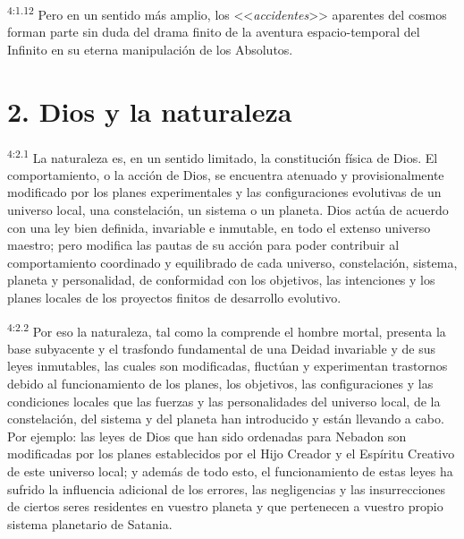 \par
\textsuperscript{4:1.12} Pero en un sentido más amplio, los <<\textit{accidentes}>> aparentes del cosmos forman parte sin duda del drama finito de la aventura espacio-temporal del Infinito en su eterna manipulación de los Absolutos.

\section*{2. Dios y la naturaleza}
\par
\textsuperscript{4:2.1} La naturaleza es, en un sentido limitado, la constitución física de Dios. El comportamiento, o la acción de Dios, se encuentra atenuado y provisionalmente modificado por los planes experimentales y las configuraciones evolutivas de un universo local, una constelación, un sistema o un planeta. Dios actúa de acuerdo con una ley bien definida, invariable e inmutable, en todo el extenso universo maestro; pero modifica las pautas de su acción para poder contribuir al comportamiento coordinado y equilibrado de cada universo, constelación, sistema, planeta y personalidad, de conformidad con los objetivos, las intenciones y los planes locales de los proyectos finitos de desarrollo evolutivo.

\par
\textsuperscript{4:2.2} Por eso la naturaleza, tal como la comprende el hombre mortal, presenta la base subyacente y el trasfondo fundamental de una Deidad invariable y de sus leyes inmutables, las cuales son modificadas, fluctúan y experimentan trastornos debido al funcionamiento de los planes, los objetivos, las configuraciones y las condiciones locales que las fuerzas y las personalidades del universo local, de la constelación, del sistema y del planeta han introducido y están llevando a cabo. Por ejemplo: las leyes de Dios que han sido ordenadas para Nebadon son modificadas por los planes establecidos por el Hijo Creador y el Espíritu Creativo de este universo local; y además de todo esto, el funcionamiento de estas leyes ha sufrido la influencia adicional de los errores, las negligencias y las insurrecciones de ciertos seres residentes en vuestro planeta y que pertenecen a vuestro propio sistema planetario de Satania.

